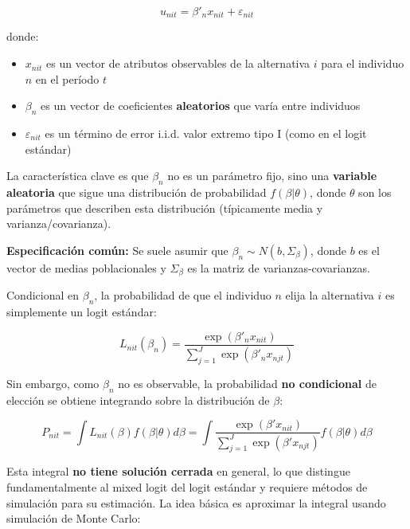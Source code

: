 \documentclass[
]{book}
\providecommand{\tightlist}{%
  \setlength{\itemsep}{0pt}\setlength{\parskip}{0pt}}
\begin{document}
\begin{equation}
u_{nit} = \beta'_n x_{nit} + \varepsilon_{nit}
\label{eq:mixedutil}
\end{equation}

donde:

\begin{itemize}
\tightlist
\item
  \(x_{nit}\) es un vector de atributos observables de la alternativa \(i\) para el individuo \(n\) en el período \(t\)
\item
  \(\beta_n\) es un vector de coeficientes \textbf{aleatorios} que varía entre individuos
\item
  \(\varepsilon_{nit}\) es un término de error i.i.d. valor extremo tipo I (como en el logit estándar)
\end{itemize}

La característica clave es que \(\beta_n\) no es un parámetro fijo, sino una \textbf{variable aleatoria} que sigue una distribución de probabilidad \(f(\beta | \theta)\), donde \(\theta\) son los parámetros que describen esta distribución (típicamente media y varianza/covarianza).

\textbf{Especificación común:} Se suele asumir que \(\beta_n \sim N(b, \Sigma_\beta)\), donde \(b\) es el vector de medias poblacionales y \(\Sigma_\beta\) es la matriz de varianzas-covarianzas.

Condicional en \(\beta_n\), la probabilidad de que el individuo \(n\) elija la alternativa \(i\) es simplemente un logit estándar:

\begin{equation}
L_{nit}(\beta_n) = \frac{\exp(\beta'_n x_{nit})}{\sum_{j=1}^J \exp(\beta'_n x_{njt})}
\label{eq:condlogit}
\end{equation}

Sin embargo, como \(\beta_n\) no es observable, la probabilidad \textbf{no condicional} de elección se obtiene integrando sobre la distribución de \(\beta\):

\begin{equation}
P_{nit} = \int L_{nit}(\beta) f(\beta | \theta) d\beta = \int \frac{\exp(\beta' x_{nit})}{\sum_{j=1}^J \exp(\beta' x_{njt})} f(\beta | \theta) d\beta
\label{eq:mixedprob}
\end{equation}

Esta integral \textbf{no tiene solución cerrada} en general, lo que distingue fundamentalmente al mixed logit del logit estándar y requiere métodos de simulación para su estimación. La idea básica es aproximar la integral usando simulación de Monte Carlo:
\end{document}
